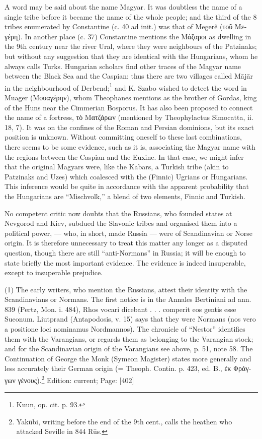 A word may be said about the name Magyar. It was doubtless the name of a single tribe before it became the name of the whole people; and the third of the 8 tribes enumerated by Constantine (c. 40 ad init.) was that of Megerê (\textgreek{το\texthebrew{ῦ} Μεγέρη}). In another place (c. 37) Constantine mentions the \textgreek{Μάζαροι} as dwelling in the 9th century near the river Ural, where they were neighbours of the Patzinaks; but without any suggestion that they are identical with the Hungarians, whom he always calls Turks. Hungarian scholars find other traces of the Magyar name between the Black Sea and the Caspian: thus there are two villages called Mājār in the neighbourhood of Derbend;\footnote{Kuun, op. cit. p. 93.} and K. Szabo wished to detect the word in Muager (\textgreek{Μουαγέρην}), whom Theophanes mentions as the brother of Gordas, king of the Huns near the Cimmerian Bosporus. It has also been proposed to connect the name of a fortress, \textgreek{τ\texthebrew{ὸ} Ματζάρων} (mentioned by Theophylactus Simocatta, ii. 18, 7). It was on the confines of the Roman and Persian dominions, but its exact position is unknown. Without committing oneself to these last combinations, there seems to be some evidence, such as it is, associating the Magyar name with the regions between the Caspian and the Euxine. In that case, we might infer that the original Magyars were, like the Kabars, a Turkish tribe (akin to Patzinaks and Uzes) which coalesced with the (Finnic) Ugrians or Hungarians. This inference would be quite in accordance with the apparent probability that the Hungarians are \texthebrew{“}Mischvolk,\texthebrew{}” a blend of two elements, Finnic and Turkish.


No competent critic now doubts that the Russians, who founded states at Nevgorod and Kiev, subdued the Slavonic tribes and organised them into a political power, \texthebrew{—} who, in short, made Russia \texthebrew{—} were of Scandinavian or Norse origin. It is therefore unnecessary to treat this matter any longer as a disputed question, though there are still \texthebrew{“}anti-Normans\texthebrew{}” in Russia; it will be enough to state briefly the most important evidence. The evidence is indeed insuperable, except to insuperable prejudice.

(1) The early writers, who mention the Russians, attest their identity with the Scandinavians or Normans. The first notice is in the Annales Bertiniani ad ann. 839 (Pertz, Mon. i. 484), Rhos vocari dicebant . . . comperit eos gentis esse Sueonum. Liutprand (Antapodosis, v. 15) says that they were Normans (nos vero a positione loci nominamus Nordmannos). The chronicle of \texthebrew{“}Nestor\texthebrew{}” identifies them with the Varangians, or regards them as belonging to the Varangian stock; and for the Scandinavian origin of the Varangians see above, p. 51, note 58. The Continuation of George the Monk (Symeon Magister) states more generally and less accurately their German origin (= Theoph. Contin. p. 423, ed. B., \textgreek{\texthebrew{ἐ}κ Φράγγων γένους}).\footnote{Yakūbi, writing before the end of the 9th cent., calls the heathen who attacked Seville in 844 Rūs.}
Edition: current; Page: [402]


